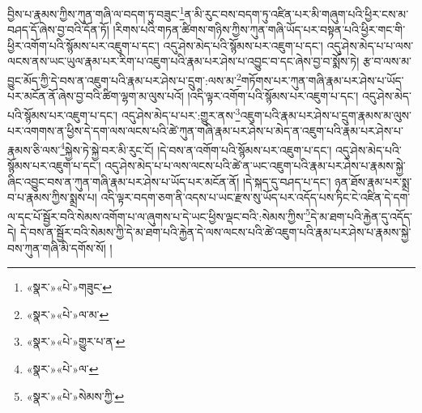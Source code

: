 བྱིས་པ་རྣམས་ཀྱིས་ཀུན་གཞི་ལ་བདག་ཏུ་བཟུང་\footnote{«སྣར་»«པེ་»གཟུང་}ན་མི་རུང་བས་བདག་ཏུ་འཛིན་པར་མི་གཞུག་པའི་ཕྱིར་ངས་མ་བཤད་དོ་ཞེས་བྱ་བའི་དོན་ཏོ། །རིགས་པའི་གཏན་ཚིགས་གཉིས་ཀྱིས་ཀུན་གཞི་ཡོད་པར་བསྟན་པའི་ཕྱིར་གང་གི་ཕྱིར་འགོག་པའི་སྙོམས་པར་འཇུག་པ་དང་། འདུ་ཤེས་མེད་པའི་སྙོམས་པར་འཇུག་པ་དང་། འདུ་ཤེས་མེད་པ་པ་ལས་ལངས་ནས་ཡང་ཡུལ་རྣམ་པར་རིག་པ་འཇུག་པའི་རྣམ་པར་ཤེས་པ་འབྱུང་བ་དང་ཞེས་བྱ་བ་སྨོས་ཏེ། རྩ་བ་ལས་མ་བྱུང་མོད་ཀྱི་དེ་བས་ན་འཇུག་པའི་རྣམ་པར་ཤེས་པ་དྲུག་:ལས་མ་\footnote{«སྣར་»«པེ་»ལ་མ་}གཏོགས་པར་ཀུན་གཞི་རྣམ་པར་ཤེས་པ་ཡོད་པར་མངོན་ནོ་ཞེས་བྱ་བའི་ཚིག་ལྷག་མ་ལུས་པའོ། །འདི་ལྟར་འགོག་པའི་སྙོམས་པར་འཇུག་པ་དང་། འདུ་ཤེས་མེད་པའི་སྙོམས་པར་འཇུག་པ་དང་། འདུ་ཤེས་མེད་པ་པར་:གྱུར་ནས་\footnote{«སྣར་»«པེ་»གྱུར་པ་ན་}འཇུག་པའི་རྣམ་པར་ཤེས་པ་དྲུག་རྣམས་མ་ལུས་པར་འགགས་ན་ཕྱིས་དེ་དག་ལས་ལངས་པའི་ཚེ་ཀུན་གཞི་རྣམ་པར་ཤེས་པ་མེད་ན་འཇུག་པའི་རྣམ་པར་ཤེས་པ་རྣམས་ཅི་ལས་\footnote{«སྣར་»«པེ་»ལ་}སྐྱེས་ཏེ་སྐྱེ་བར་མི་རུང་ངོ། །དེ་བས་ན་འགོག་པའི་སྙོམས་པར་འཇུག་པ་དང་། འདུ་ཤེས་མེད་པའི་སྙོམས་པར་འཇུག་པ་དང་། འདུ་ཤེས་མེད་པ་པ་ལས་ལངས་པའི་ཚེ་ན་ཡང་འཇུག་པའི་རྣམ་པར་ཤེས་པ་རྣམས་སྐྱེ་ཞིང་འབྱུང་བས་ན་ཀུན་གཞི་རྣམ་པར་ཤེས་པ་ཡོད་པར་མངོན་ནོ། །དེ་སྐད་དུ་བཤད་པ་དང་། ཉན་ཐོས་རྣམ་པར་སྨྲ་བ་པ་རྣམས་ཀྱིས་སྨྲས་པ། འདི་ལྟར་བདག་ཅག་ནི་འདས་པ་ཡང་རྫས་སུ་ཡོད་པར་འདོད་པས་ཏིང་ངེ་འཛིན་དེ་དག་ལ་དང་པོ་སྦྱོར་བའི་སེམས་འགོག་པ་ལ་ཞུགས་པ་དེ་ཡང་ཕྱིས་ལྡང་བའི་:སེམས་ཀྱིས་\footnote{«སྣར་»«པེ་»སེམས་ཀྱི་}དེ་མ་ཐག་པའི་རྐྱེན་དུ་འདོད་དེ། དེ་བས་ན་སྦྱོར་བའི་སེམས་ཀྱི་དེ་མ་ཐག་པའི་རྐྱེན་དེ་ལས་ལངས་པའི་ཚེ་འཇུག་པའི་རྣམ་པར་ཤེས་པ་རྣམས་སྐྱེ་བས་ཀུན་གཞི་མི་དགོས་སོ། །
